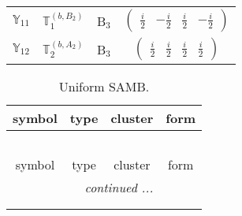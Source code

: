 \documentclass[fleqn,10pt,landscape]{article}
\begin{document}
\begin{itemize}
\begin{center}
\begin{longtable}{c|c|c|c}
$ \mathbb{Y}_{11} $ & $\mathbb{T}_{1}^{(b,B_{2})}$ & B$_{3}$ & $\begin{pmatrix} \frac{i}{2} & - \frac{i}{2} & \frac{i}{2} & - \frac{i}{2} \end{pmatrix}$ \\
$ \mathbb{Y}_{12} $ & $\mathbb{T}_{2}^{(b,A_{2})}$ & B$_{3}$ & $\begin{pmatrix} \frac{i}{2} & \frac{i}{2} & \frac{i}{2} & \frac{i}{2} \end{pmatrix}$ \\
\end{longtable}
\end{center}
\begin{center}
\renewcommand{\arraystretch}{1.3}
\begin{longtable}{c|c|c|c}
\caption{Uniform SAMB.}
 \\
 \hline \hline
symbol & type & cluster & form \\ \hline \endfirsthead

\multicolumn{3}{l}{\tablename\ \thetable{}} \\
 \hline \hline
symbol & type & cluster & form \\ \hline \endhead

 \hline \hline
\multicolumn{3}{r}{\footnotesize\it continued ...} \\ \endfoot

 \hline \hline
\multicolumn{3}{r}{} \\ \endlastfoot


\end{longtable}
\end{center}
\end{itemize}
\end{document}
